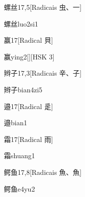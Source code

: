 \begin{entry}{螺丝}{17,5}[Radicais ⾍、⼀]
  \begin{phonetics}{螺丝}{luo2si1}
  \end{phonetics}
\end{entry}

\begin{entry}{赢}{17}[Radical ⾙]
  \begin{phonetics}{赢}{ying2}[][HSK 3]
  \end{phonetics}
\end{entry}

\begin{entry}{辫子}{17,3}[Radicais ⾟、⼦]
  \begin{phonetics}{辫子}{bian4zi5}
  \end{phonetics}
\end{entry}

\begin{entry}{邉}{17}[Radical ⾡]
  \begin{phonetics}{邉}{bian1}
  \end{phonetics}
\end{entry}

\begin{entry}{霜}{17}[Radical ⾬]
  \begin{phonetics}{霜}{shuang1}
  \end{phonetics}
\end{entry}

\begin{entry}{鳄鱼}{17,8}[Radicais ⿂、⿂]
  \begin{phonetics}{鳄鱼}{e4yu2}
  \end{phonetics}
\end{entry}


